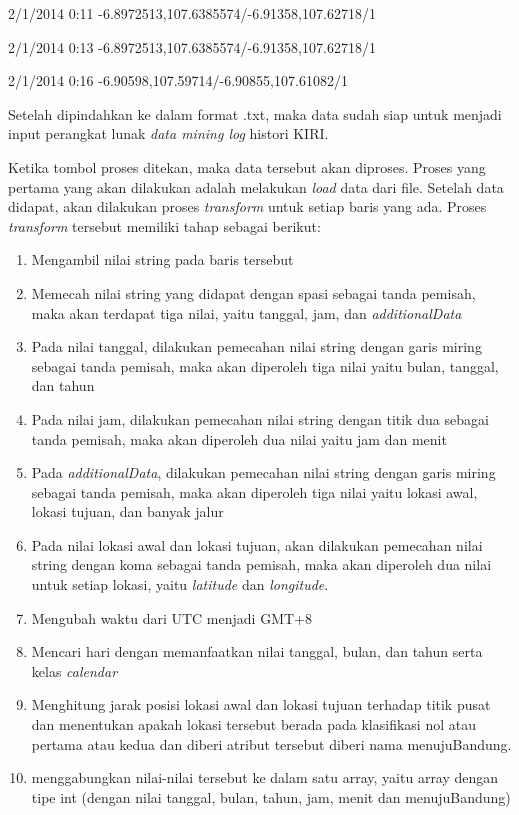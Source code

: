 2/1/2014 0:11 -6.8972513,107.6385574/-6.91358,107.62718/1

2/1/2014 0:13 -6.8972513,107.6385574/-6.91358,107.62718/1

2/1/2014 0:16 -6.90598,107.59714/-6.90855,107.61082/1

Setelah dipindahkan ke dalam format .txt, maka data sudah siap untuk menjadi input perangkat lunak \textsl{data mining log} histori KIRI.

Ketika tombol proses ditekan, maka data tersebut akan diproses. Proses yang pertama yang akan dilakukan adalah melakukan \textsl{load} data dari file. Setelah data didapat, akan dilakukan proses \textsl{transform} untuk setiap baris yang ada. Proses \textsl{transform} tersebut memiliki tahap sebagai berikut:
\begin{enumerate}
	\item Mengambil nilai string pada baris tersebut
	\item Memecah nilai string yang didapat dengan spasi sebagai tanda pemisah, maka akan terdapat tiga nilai, yaitu tanggal, jam, dan \textsl{additionalData}
	\item Pada nilai tanggal, dilakukan pemecahan nilai string dengan garis miring sebagai tanda pemisah, maka akan diperoleh tiga nilai yaitu bulan, tanggal, dan tahun
	\item Pada nilai jam, dilakukan pemecahan nilai string dengan titik dua sebagai tanda pemisah, maka akan diperoleh dua nilai yaitu jam dan menit
	\item Pada \textsl{additionalData}, dilakukan pemecahan nilai string dengan garis miring sebagai tanda pemisah, maka akan diperoleh tiga nilai yaitu lokasi awal, lokasi tujuan, dan banyak jalur
	\item Pada nilai lokasi awal dan lokasi tujuan, akan dilakukan pemecahan nilai string dengan koma sebagai tanda pemisah, maka akan diperoleh dua nilai untuk setiap lokasi, yaitu \textsl{latitude} dan \textsl{longitude}.
	\item Mengubah waktu dari UTC menjadi GMT+8
	\item Mencari hari dengan memanfaatkan nilai tanggal, bulan, dan tahun serta kelas \textsl{calendar}
	\item Menghitung jarak posisi lokasi awal dan lokasi tujuan terhadap titik pusat dan menentukan apakah lokasi tersebut berada pada klasifikasi nol atau pertama atau kedua dan diberi atribut tersebut diberi nama menujuBandung.
	\item menggabungkan nilai-nilai tersebut ke dalam satu array, yaitu array dengan tipe int (dengan nilai tanggal, bulan, tahun, jam, menit dan menujuBandung)
\end{enumerate}

